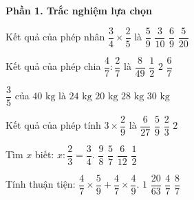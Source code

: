 \textbf{Phần 1. Trắc nghiệm lựa chọn}

\begin{ex} %
Kết quả của phép nhân $\dfrac{3}{4} \times \dfrac{2}{5}$ là
\choice
{$\dfrac{5}{9}$}
{\True $\dfrac{3}{10}$}
{$\dfrac{6}{9}$}
{$\dfrac{5}{20}$}
\end{ex}

\begin{ex} %
Kết quả của phép chia $\dfrac{4}{7} : \dfrac{2}{7}$ là
\choice
{$\dfrac{8}{49}$}
{$\dfrac{1}{2}$}
{\True $2$}
{$\dfrac{6}{7}$}
\end{ex}

\begin{ex} %
$\dfrac{3}{5}$ của $40\text{ kg}$ là
\choice
{\True $24\text{ kg}$}
{$20\text{ kg}$}
{$28\text{ kg}$}
{$30\text{ kg}$}
\end{ex}

\begin{ex} %
Kết quả của phép tính $3 \times \dfrac{2}{9}$ là
\choice
{$\dfrac{6}{27}$}
{$\dfrac{5}{9}$}
{\True $\dfrac{2}{3}$}
{$2$}
\end{ex}

\begin{ex} %
Tìm $x$ biết: $x : \dfrac{2}{3} = \dfrac{3}{4}$.
\choice
{$\dfrac{9}{8}$}
{$\dfrac{5}{7}$}
{$\dfrac{6}{12}$}
{\True $\dfrac{1}{2}$}
\end{ex}

\begin{ex} %
Tính thuận tiện: $\dfrac{4}{7} \times \dfrac{5}{9} + \dfrac{4}{7} \times \dfrac{4}{9}$.
\choice
{$1$}
{$\dfrac{20}{63}$}
{\True $\dfrac{4}{7}$}
{$\dfrac{8}{7}$}
\end{ex}


